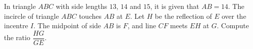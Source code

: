 In triangle $ABC$ with side lengths $13$, $14$ and $15$, it is given that $AB=14$. The incircle of triangle $ABC$ touches $AB$ at $E$. Let $H$ be the reflection of $E$ over the incentre $I$. The midpoint of side $AB$ is $F$, and line $CF$ meets $EH$ at $G$. Compute the ratio $\dfrac{HG}{GE}$.
